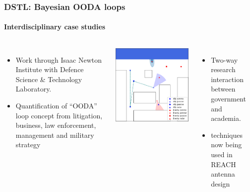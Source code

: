 \documentclass[aspectratio=169, handout]{beamer}
\begin{document}
\begin{frame}
    \frametitle{DSTL: Bayesian OODA loops}
    \framesubtitle{Interdisciplinary case studies}
    \begin{columns}
        \begin{itemize}
            \item Work through Isaac Newton Institute with Defence Science \& Technology Laboratory.
            \item Quantification of ``OODA'' loop concept from litigation, business, law enforcement, management and military strategy
        \end{itemize}


        \begin{columns}
            \includegraphics[width=\textwidth]{figures/midas.png}%
            \begin{itemize}
                \item Two-way research interaction between government and academia.
                \item techniques now being used in REACH antenna design~
            \end{itemize}
        \end{columns}



\end{columns}
\end{frame}
\end{document}
